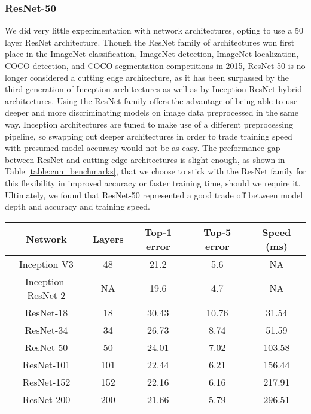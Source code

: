 \documentclass[pageno]{jpaper}
\begin{document}
\subsubsection{ResNet-50}
We did very little experimentation with network architectures, opting to use a 50 layer ResNet architecture. Though the ResNet family of architectures won first place in the ImageNet classification, ImageNet detection, ImageNet localization, COCO detection, and COCO segmentation competitions in 2015, ResNet-50 is no longer considered a cutting edge architecture, as it has been surpassed by the third generation of Inception architectures as well as by Inception-ResNet hybrid architectures.\cite{He2015}\cite{szegedy2016inception} Using the ResNet family offers the advantage of being able to use deeper and more discriminating models on image data preprocessed in the same way. Inception architectures are tuned to make use of a different preprocessing pipeline, so swapping out deeper architectures in order to trade training speed with presumed model accuracy would not be as easy.  The preformance gap between ResNet and cutting edge architectures is slight enough, as shown in Table \ref{table:cnn_benchmarks}, that we choose to stick with the ResNet family for this flexibility in improved accuracy or faster training time, should we require it. Ultimately, we found that ResNet-50 represented a good trade off between model depth and accuracy and training speed.\\

\begin{center}
 \begin{tabular}{||c c c c c||} 
 \hline
 Network & Layers & Top-1 error & Top-5 error & Speed (ms) \\ [0.5ex] 
 \hline\hline
 Inception V3 & 48 & 21.2 & 5.6 & NA \\ 
 \hline
 Inception-ResNet-2 & NA & 19.6 & 4.7 & NA \\ 
 \hline
 ResNet-18 & 18 & 30.43 & 10.76 & 31.54 \\ 
 \hline
 ResNet-34 & 34 & 26.73 & 8.74 & 51.59 \\ 
 \hline
  ResNet-50 & 50 & 24.01 & 7.02 & 103.58 \\ 
 \hline
  ResNet-101 & 101 & 22.44 & 6.21 & 156.44 \\ 
 \hline
  ResNet-152 & 152 & 22.16 & 6.16 & 217.91 \\ 
 \hline
  ResNet-200 & 200 & 21.66 & 5.79 & 296.51 \\[1ex] 
 \hline
\end{tabular}
\label{table:cnn_benchmarks}
\end{center}
\end{document}
